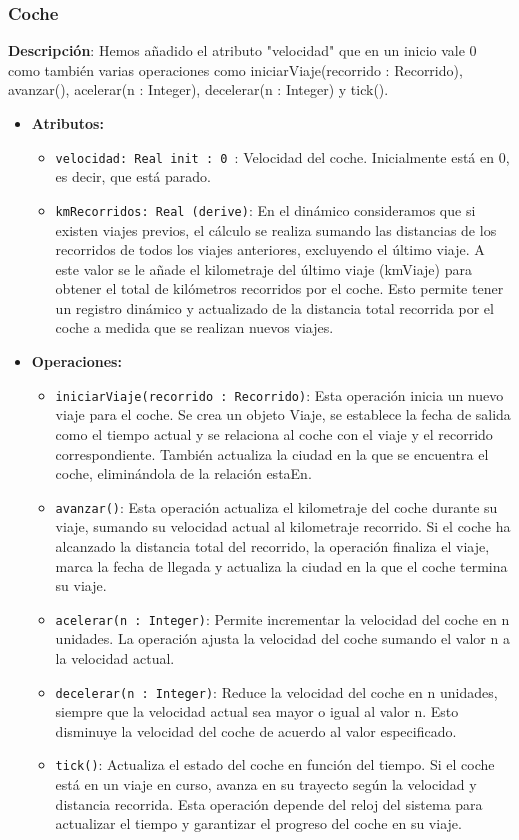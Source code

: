 \documentclass[12pt.a4paper]{article}
\begin{document}
\subsubsection{Coche}
\textbf{Descripción}:  Hemos añadido el atributo "velocidad" que en un inicio vale 0 como también varias operaciones como iniciarViaje(recorrido : Recorrido), avanzar(), acelerar(n : Integer), decelerar(n : Integer) y tick().
\begin{itemize}
    \item \textbf{Atributos:}
    \begin{itemize}
        \item \texttt{velocidad: Real init : 0 }: Velocidad del coche. Inicialmente está en 0, es decir, que está parado.
        \item \texttt{kmRecorridos: Real (derive)}: En el dinámico consideramos que si existen viajes previos, el cálculo se realiza sumando las distancias de los recorridos de todos los viajes anteriores, excluyendo el último viaje. A este valor se le añade el kilometraje del último viaje (kmViaje) para obtener el total de kilómetros recorridos por el coche. Esto permite tener un registro dinámico y actualizado de la distancia total recorrida por el coche a medida que se realizan nuevos viajes.
    \end{itemize}
    \item \textbf{Operaciones:}
    \begin{itemize}
        \item \texttt{iniciarViaje(recorrido : Recorrido)}: Esta operación inicia un nuevo viaje para el coche. Se crea un objeto Viaje, se establece la fecha de salida como el tiempo actual y se relaciona al coche con el viaje y el recorrido correspondiente. También actualiza la ciudad en la que se encuentra el coche, eliminándola de la relación estaEn.
        \item \texttt{avanzar()}: Esta operación actualiza el kilometraje del coche durante su viaje, sumando su velocidad actual al kilometraje recorrido. Si el coche ha alcanzado la distancia total del recorrido, la operación finaliza el viaje, marca la fecha de llegada y actualiza la ciudad en la que el coche termina su viaje.
        \item \texttt{acelerar(n : Integer)}: Permite incrementar la velocidad del coche en n unidades. La operación ajusta la velocidad del coche sumando el valor n a la velocidad actual.
        \item \texttt{decelerar(n : Integer)}: Reduce la velocidad del coche en n unidades, siempre que la velocidad actual sea mayor o igual al valor n. Esto disminuye la velocidad del coche de acuerdo al valor especificado.
        \item \texttt{tick()}: Actualiza el estado del coche en función del tiempo. Si el coche está en un viaje en curso, avanza en su trayecto según la velocidad y distancia recorrida. Esta operación depende del reloj del sistema para actualizar el tiempo y garantizar el progreso del coche en su viaje.
    \end{itemize}
\end{itemize}
\end{document}
